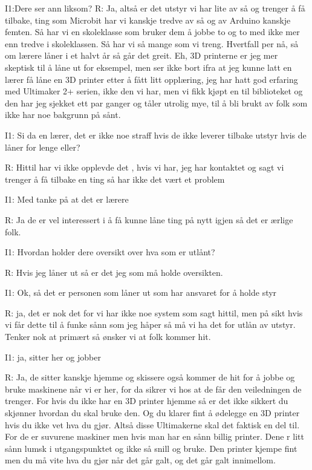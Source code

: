 I1:Dere ser ann liksom?
R: Ja,  altså er det utstyr vi har lite av så og trenger å få tilbake, ting som Microbit har vi kanskje tredve av så og av Arduino kanskje femten. Så har vi en skoleklasse som bruker dem å jobbe to og to med ikke mer enn tredve i skoleklassen. Så har vi så mange som vi treng. Hvertfall per nå, så om lærere låner i et halvt år så går det greit. Eh, 3D printerne er jeg mer skeptisk til å låne ut for eksempel, men ser ikke bort ifra at jeg kunne latt en lærer få låne en 3D printer etter å fått litt opplæring, jeg har hatt god erfaring med Ultimaker 2+ serien, ikke den vi har, men vi fikk kjøpt en til biblioteket og den har jeg sjekket ett par ganger og tåler utrolig mye, til å bli brukt av folk som ikke har noe bakgrunn på sånt.

I1: Si da en lærer, det er ikke noe straff hvis de ikke leverer tilbake utstyr hvis de låner for lenge eller?

R: Hittil har vi ikke opplevde det , hvis vi har, jeg har kontaktet og sagt vi trenger å få tilbake en ting så har ikke det vært et problem 

I1: Med tanke på at det er lærere

R: Ja de er vel interessert i å få kunne låne ting på nytt igjen så det er ærlige folk. 

I1: Hvordan holder dere oversikt over hva som er utlånt?

R: Hvis jeg låner ut så er det jeg som må holde oversikten. 

I1: Ok, så det er personen som låner ut som har ansvaret for å holde styr

R: ja, det er nok det for vi har ikke noe system som sagt hittil, men på sikt hvis vi får dette til å funke sånn som jeg håper så må vi ha det for utlån av utstyr. Tenker nok at primært så ønsker vi at folk kommer hit.

I1: ja, sitter her og jobber

R: Ja, de sitter kanskje hjemme og skissere også kommer de hit for å jobbe og bruke maskinene når vi er her, for da sikrer vi hos at de får den veiledningen de trenger. For hvis du ikke har en 3D printer hjemme så er det ikke sikkert du skjønner hvordan du skal bruke den. Og du klarer fint å ødelegge en 3D printer hvis du ikke vet hva du gjør. Altså disse Ultimakerne skal det faktisk en del til. For de er suvurene maskiner men hvis man har en sånn billig printer. Dene r litt sånn lumsk i utgangspunktet og ikke så snill og bruke. Den printer kjempe fint men du må vite hva du gjør når det går galt, og det går galt  innimellom. 

